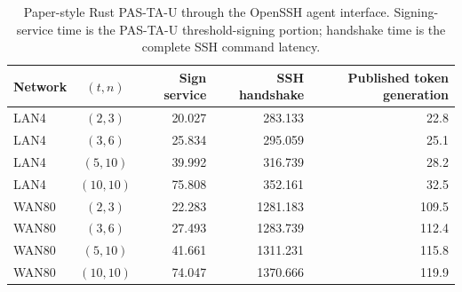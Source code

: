 \begin{table}[t]
\centering
\caption{Paper-style Rust PAS-TA-U through the OpenSSH agent interface. Signing-service time is the PAS-TA-U threshold-signing portion; handshake time is the complete SSH command latency.}
\label{tab:pastau-ssh-validation}
\begin{tabular}{l c r r r}
\toprule
Network & $(t,n)$ & Sign service & SSH handshake & Published token generation \\
\midrule
LAN4 & $(2,3)$ & 20.027 & 283.133 & 22.8 \\
LAN4 & $(3,6)$ & 25.834 & 295.059 & 25.1 \\
LAN4 & $(5,10)$ & 39.992 & 316.739 & 28.2 \\
LAN4 & $(10,10)$ & 75.808 & 352.161 & 32.5 \\
\midrule
WAN80 & $(2,3)$ & 22.283 & 1281.183 & 109.5 \\
WAN80 & $(3,6)$ & 27.493 & 1283.739 & 112.4 \\
WAN80 & $(5,10)$ & 41.661 & 1311.231 & 115.8 \\
WAN80 & $(10,10)$ & 74.047 & 1370.666 & 119.9 \\
\bottomrule
\end{tabular}
\end{table}
